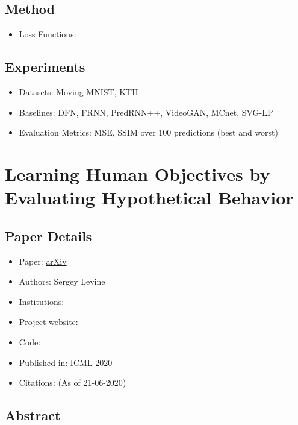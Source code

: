 \documentclass{article}
\begin{document}
    \subsection{Method}\label{subsec:Probabilistic_Video_Prediction_from_Noisy_Data_with_a_Posterior_Confidence_(BP_Net):method}
    \begin{itemize}
        \item Loss Functions:
    \end{itemize}

    \subsection{Experiments}\label{subsec:Probabilistic_Video_Prediction_from_Noisy_Data_with_a_Posterior_Confidence_(BP_Net):experiments}
    \begin{itemize}
        \item Datasets: Moving MNIST, KTH
        \item Baselines: DFN, FRNN, PredRNN++, VideoGAN, MCnet, SVG-LP
        \item Evaluation Metrics: MSE, SSIM over 100 predictions (best and worst)
    \end{itemize}
    \newpage


    \section{Learning Human Objectives by Evaluating Hypothetical Behavior}\label{sec:Learning_Human_Objectives_by_Evaluating_Hypothetical_Behavior}
    \subsection*{Paper Details}
    \begin{itemize}
        \item Paper: \href{https://arxiv.org/abs/1912.05652}{arXiv}
        \item Authors: Sergey Levine
        \item Institutions:
        \item Project website:
        \item Code:
        \item Published in: ICML 2020
        \item Citations:  (As of 21-06-2020)
    \end{itemize}

    \subsection*{Abstract}
\end{document}
